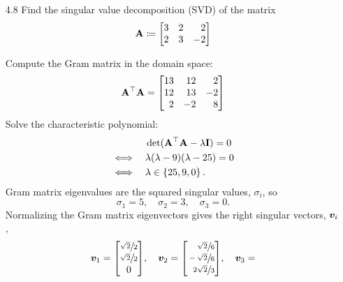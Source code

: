 \documentclass[11pt]{article}
\begin{document}
\begin{enumerate}
          \pagebreak

    \item[4.8] Find the singular value decomposition (SVD) of the matrix
          \[
              \mat{A} \coloneq
              \begin{bmatrix*}[r]
                  3 & 2 & 2 \\
                  2 & 3 & -2 \\
              \end{bmatrix*}
          \]

          Compute the Gram matrix in the domain space:
          \[
              \mat{A}^\top \mat{A} =
              \begin{bmatrix*}[r]
                  13 & 12 & 2 \\
                  12 & 13 & -2 \\
                  2 & -2 & 8 \\
              \end{bmatrix*}
          \]
          Solve the characteristic polynomial:
          \[
              \begin{aligned}
                             & \det(\mathbf{A}^\top \mathbf{A} - \lambda \mathbf{I}) = 0 \\
                  \iff \quad & \lambda (\lambda - 9)(\lambda - 25) = 0          \\
                  \iff \quad & \lambda \in \left\{25, 9, 0\right\}.
              \end{aligned}
          \]
          Gram matrix eigenvalues are the squared singular values, $\sigma_i$, so
          \[
              \sigma_1 = 5,
              \quad
              \sigma_2 = 3,
              \quad
              \sigma_3 = 0.
          \]
          Normalizing the Gram matrix eigenvectors gives the right singular vectors, $\bm{v}_i$,
          \[
              \vect{v}_1 =
              \begin{bmatrix}
                  \sfrac{\sqrt{2}}{2} \\ \sfrac{\sqrt{2}}{2} \\ 0
              \end{bmatrix} \! ,
              \quad
              \vect{v}_2 =
              \begin{bmatrix*}[r]
                  \sfrac{\sqrt{2}}{6} \\ \sfrac{-\sqrt{2}}{6} \\ \sfrac{2\sqrt{2}}{3}
              \end{bmatrix*} \! ,
              \quad
              \vect{v}_3 =
\]
\end{enumerate}
\end{document}
